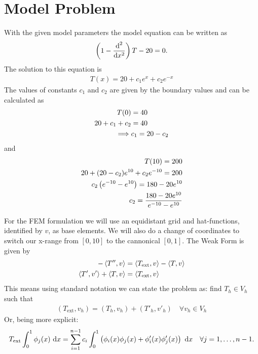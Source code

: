 
\usepackage[]{algorithm2e}

  \section{Model Problem}
  With the given model parameters the model equation can be written as
  \begin{align}
    \left(1-\drv[x^2]{^2}\right)T-20 = 0.
  \end{align}
  The solution to this equation is
  \begin{align}
    T(x) = 20+c_1 e^x +c_2 e^{-x}
  \end{align}
  The values of constants $c_1$ and  $c_2$ are given by the boundary values and can be calculated as
  \begin{align}
    T(0) &= 40\nn
    20 + c_1 + c_2 &= 40\nn
    \implies& c_1 = 20-c_2
  \end{align}
  and
  \begin{align}
    T(10) = 200\nn
    20+(20-c_2)e^{10}+c_2 e^{-10} = 200\nn
    c_2\left(e^{-10}-e^{10}\right) = 180-20e^{10}\nn
    c_2 = \frac{180-20e^{10}}{e^{-10}-e^{10}}
  \end{align}
\par For the FEM formulation we will use an equidistant grid and hat-functions, identified by $v$, as base elements. We will also
do a change of coordinates to switch our x-range from $[0,10]$ to the cannonical $[0,1]$.
The Weak Form is given by
\begin{align}
  -\inp{T''}{v} &= \inp{T_\text{ext}}{v}-\inp{T}{v}\nn
  \inp{T'}{v'} + \inp{T}{v}&= \inp{T_\text{ext}}{v}
\end{align}
This means using standard notation we can state the problem as: find $T_h \in V_h$ such that
\begin{align}
  (T_\text{ext}, v_h) = (T_h, v_h) + (T'_h, v'_h)\quad\forall v_h \in V_h
\end{align}
Or, being more explicit:
\begin{align}
  T_\text{ext} \int_0^1 \phi_j(x)\,\d{x} = \sum_{i=1}^{n-1}  c_i \int_0^1  \left(\phi_i(x)\phi_j(x) + \phi_i'(x)\phi_j'(x)\right)\,\d{x}\quad \forall j=1,\ldots,n-1.
\end{align}
